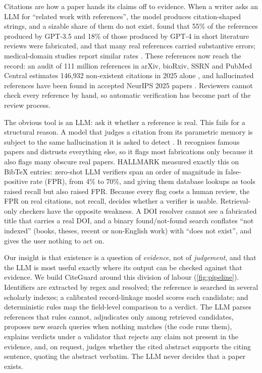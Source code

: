 \documentclass[10pt,twocolumn,a4paper]{article}
\newcommand{\cg}{CiteGuard}
\begin{document}
Citations are how a paper hands its claims off to evidence. When a writer asks an LLM for
``related work with references'', the model produces citation-shaped strings, and a sizable share of
them do not exist. \citet{walters2023fabrication} found that 55\% of the references produced by
GPT-3.5 and 18\% of those produced by GPT-4 in short literature reviews were fabricated, and that
many real references carried substantive errors; medical-domain studies report similar rates
\citep{bhattacharyya2023high,alkaissi2023artificial,chelli2024hallucination}. These references now
reach the record: an audit of 111 million references in arXiv, bioRxiv, SSRN and PubMed Central
estimates 146,932 non-existent citations in 2025 alone \citep{zhao2026wild}, and hallucinated
references have been found in accepted NeurIPS 2025 papers \citep{kim2026hallmark}. Reviewers cannot
check every reference by hand, so automatic verification has become part of the review process.

The obvious tool is an LLM: ask it whether a reference is real. This fails for a structural reason.
A model that judges a citation from its parametric memory is subject to the same hallucination it is
asked to detect \citep{ji2023survey,huang2025survey}. It recognises famous papers and distrusts
everything else, so it flags most fabrications only because it also flags many obscure real papers.
HALLMARK \citep{kim2026hallmark} measured exactly this on BibTeX entries: zero-shot LLM verifiers
span an order of magnitude in false-positive rate (FPR), from 4\% to 70\%, and giving them database
lookups as tools raised recall but also raised FPR. Because every flag costs a human review, the FPR
on real citations, not recall, decides whether a verifier is usable. Retrieval-only checkers have the
opposite weakness. A DOI resolver cannot see a fabricated title that carries a real DOI, and a
binary found/not-found search conflates ``not indexed'' (books, theses, recent or non-English work)
with ``does not exist'', and gives the user nothing to act on.

Our insight is that existence is a question of \emph{evidence}, not of \emph{judgement}, and that
the LLM is most useful exactly where its output can be checked against that evidence. We build
\cg{} around this division of labour (\cref{fig:pipeline}). Identifiers are extracted by regex and
resolved; the reference is searched in several scholarly indexes; a calibrated record-linkage model
scores each candidate; and deterministic rules map the field-level comparison to a verdict. The LLM
parses references that rules cannot, adjudicates only among retrieved candidates, proposes new
search queries when nothing matches (the code runs them), explains verdicts under a validator that
rejects any claim not present in the evidence, and, on request, judges whether the cited abstract
supports the citing sentence, quoting the abstract verbatim. The LLM never decides that a paper
exists.
\end{document}
